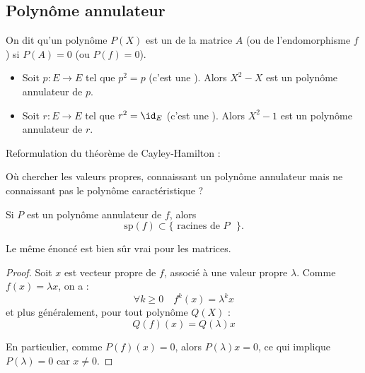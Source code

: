 \documentclass[12pt, class=report,crop=false]{standalone}
\newcommand{\Sp}{\text{sp}}
\begin{document}
\subsection{Polynôme annulateur}


\begin{definition}
On dit qu'un polynôme $P(X)$ est un  de la matrice $A$ (ou de l'endomorphisme $f$) si $P(A) =0$ (ou $P(f) = 0$). 
\end{definition}

\begin{exemple}
\sauteligne
\begin{itemize}

  \item Soit $p : E \to E$ tel que $p ^2=p$ (c'est une ). Alors $X^2-X$ est un polynôme annulateur de $p$.

  \item Soit $r : E \to E$ tel que $r^2 =\id_E$ (c'est une ). Alors $X^2-1$ est un polynôme annulateur de $r$.
\end{itemize}
\end{exemple}

Reformulation du théorème de Cayley-Hamilton : 



Où chercher les valeurs propres, connaissant un polynôme annulateur mais ne connaissant pas le polynôme caractéristique ?
\begin{proposition}
Si $P$ est un polynôme annulateur de $f$, alors 
\[\Sp (f) \subset \{\text{ racines de $P$ }\}.\]
\end{proposition}
Le même énoncé est bien sûr vrai pour les matrices.

\begin{proof}
Soit $x$ est vecteur propre de $f$, associé à une valeur propre $\lambda$.
Comme $f(x) = \lambda x$, on a :
\[\forall k \ge 0 \quad f^k(x) = \lambda^k x\]
et plus généralement, pour tout polynôme $Q(X)$ :
\[Q(f)(x) = Q(\lambda)x \]

En particulier, comme $P(f)(x)=0$, alors $P(\lambda) x =0$, ce qui implique 
$P(\lambda) = 0$ car $x \neq 0$.
\end{proof}
\end{document}
